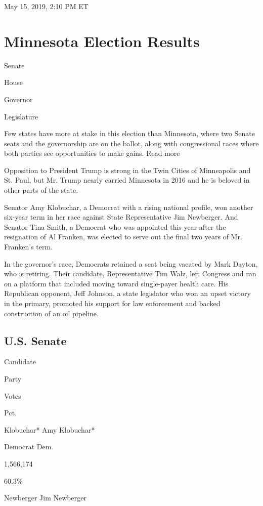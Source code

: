 May 15, 2019, 2:10 PM ET

\hypertarget{minnesota-election-results}{%
\section{Minnesota Election Results}\label{minnesota-election-results}}

Senate

House

Governor

Legislature

Few states have more at stake in this election than Minnesota, where two
Senate seats and the governorship are on the ballot, along with
congressional races where both parties see opportunities to make gains.
Read more

Opposition to President Trump is strong in the Twin Cities of
Minneapolis and St. Paul, but Mr. Trump nearly carried Minnesota in 2016
and he is beloved in other parts of the state.

Senator Amy Klobuchar, a Democrat with a rising national profile, won
another six-year term in her race against State Representative Jim
Newberger. And Senator Tina Smith, a Democrat who was appointed this
year after the resignation of Al Franken, was elected to serve out the
final two years of Mr. Franken's term.

In the governor's race, Democrats retained a seat being vacated by Mark
Dayton, who is retiring. Their candidate, Representative Tim Walz, left
Congress and ran on a platform that included moving toward single-payer
health care. His Republican opponent, Jeff Johnson, a state legislator
who won an upset victory in the primary, promoted his support for law
enforcement and backed construction of an oil pipeline.

\hypertarget{us-senate}{%
\subsection{U.S. Senate}\label{us-senate}}

Candidate

Party

Votes

Pct.

 Klobuchar* Amy Klobuchar*

Democrat Dem.

1,566,174

60.3\%

 Newberger Jim Newberger

